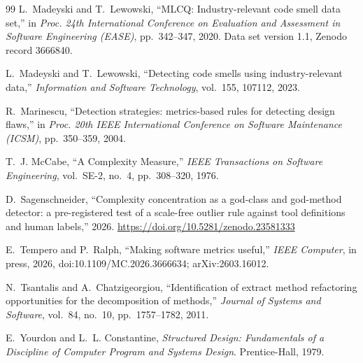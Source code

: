 \documentclass[11pt,a4paper]{article}
\begin{document}
\begin{thebibliography}{99}
 L.~Madeyski and T.~Lewowski,
  ``MLCQ: Industry-relevant code smell data set,''
  in \emph{Proc. 24th International Conference on Evaluation and Assessment in
  Software Engineering (EASE)}, pp.~342--347, 2020. Data set version 1.1,
  Zenodo record 3666840.

 L.~Madeyski and T.~Lewowski,
  ``Detecting code smells using industry-relevant data,''
  \emph{Information and Software Technology}, vol.~155, 107112, 2023.

 R.~Marinescu,
  ``Detection strategies: metrics-based rules for detecting design flaws,''
  in \emph{Proc. 20th IEEE International Conference on Software Maintenance
  (ICSM)}, pp.~350--359, 2004.

 T.~J. McCabe,
  ``A Complexity Measure,''
  \emph{IEEE Transactions on Software Engineering}, vol.~SE-2, no.~4,
  pp.~308--320, 1976.

 D.~Sagenschneider,
  ``Complexity concentration as a god-class and god-method detector: a
  pre-registered test of a scale-free outlier rule against tool definitions
  and human labels,'' 2026. \url{https://doi.org/10.5281/zenodo.23581333}

 E.~Tempero and P.~Ralph,
  ``Making software metrics useful,''
  \emph{IEEE Computer}, in press, 2026, doi:10.1109/MC.2026.3666634;
  arXiv:2603.16012.

 N.~Tsantalis and A.~Chatzigeorgiou,
  ``Identification of extract method refactoring opportunities for the
  decomposition of methods,'' \emph{Journal of Systems and Software},
  vol.~84, no.~10, pp.~1757--1782, 2011.

 E.~Yourdon and L.~L. Constantine,
  \emph{Structured Design: Fundamentals of a Discipline of Computer Program
  and Systems Design}. Prentice-Hall, 1979.

\end{thebibliography}
\end{document}
